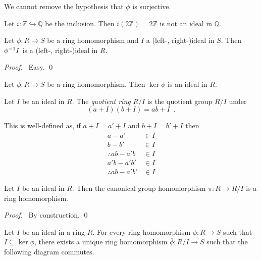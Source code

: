 \begin{ex}
We cannot remove the hypothesis that $\phi$ is surjective.

Let $i : \mathbb{Z} \hookrightarrow \mathbb{Q}$ be the inclusion. Then $i(2 \mathbb{Z}) = 2 \mathbb{Z}$ is not an ideal in $\mathbb{Q}$.
\end{ex}

\begin{prop}
Let $\phi : R \rightarrow S$ be a ring homomorphism and $I$ a (left-, right-)ideal in $S$. Then ${\phi}^{-1}{I}$ is a (left-, right-)ideal in $R$.
\end{prop}

\begin{proof}
\pf\ Easy. \qed
\end{proof}

\begin{cor}
Let $\phi : R \rightarrow S$ be a ring homomorphism. Then $\ker \phi$ is an ideal in $R$.
\end{cor}

\begin{df}
Let $I$ be an ideal in $R$. The \emph{quotient ring} $R / I$ is the quotient group $R/I$ under
\[ (a + I)(b + I) = ab + I \enspace . \]

This is well-defined as, if $a + I = a' + I$ and $b + I = b' + I$ then
\begin{align*}
a-a' & \in I \\
b - b' & \in I \\
\therefore ab - a'b & \in I \\
a'b - a'b' & \in I \\
\therefore ab - a'b' & \in I
\end{align*}
\end{df}

\begin{prop}
Let $I$ be an ideal in $R$. Then the canonical group homomorphism $\pi : R \rightarrow R / I$ is a ring homomorphism.
\end{prop}

\begin{proof}
\pf\ By construction. \qed
\end{proof}

\begin{prop}
Let $I$ be an ideal in a ring $R$. For every ring homomorphism $\phi : R \rightarrow S$ such that $I \subseteq \ker \phi$, there exists a unique ring homomorphism $\overline{\phi} : R / I \rightarrow S$ such that the following diagram commutes.

\begin{center}
\end{center}
\end{prop}

